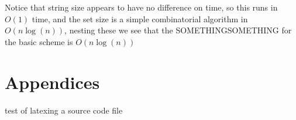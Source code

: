 \documentclass[10pt]{article}
\begin{document}
Notice that string size appears to have no difference on time, so this runs in $O(1)$ time, and the set size is a simple combinatorial algorithm in $O(n\log(n))$, nesting these we see that the SOMETHINGSOMETHING for the basic scheme is $O(n\log(n))$ 



\section{Appendices}
test of latexing a source code file




%
\begin{thebibliography}{1}





\end{thebibliography}
\end{document}
